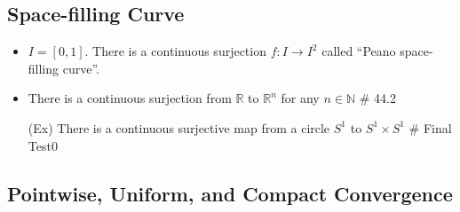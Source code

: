 \documentclass[12pt]{article}
\newcommand{\Nat}{\mathbb{N}}
\newcommand{\Real}{\mathbb{R}}
\begin{document}
\bigskip

\subsection{Space-filling Curve}
\smallskip
\begin{itemize}
    \item $I=[0,1]$. There is a continuous surjection $f:I\rightarrow I^2$ called ``Peano space-filling curve''.
    \item There is a continuous surjection from $\Real$ to $\Real^n$ for any $n\in \Nat$ \quad \# 44.2
    \item[(Ex)] There is a continuous surjective map from a circle $S^1$ to $S^1\times S^1$ \; \# Final Test0
\end{itemize}
\bigskip

\subsection{Pointwise, Uniform, and Compact Convergence}
\smallskip
\end{document}

